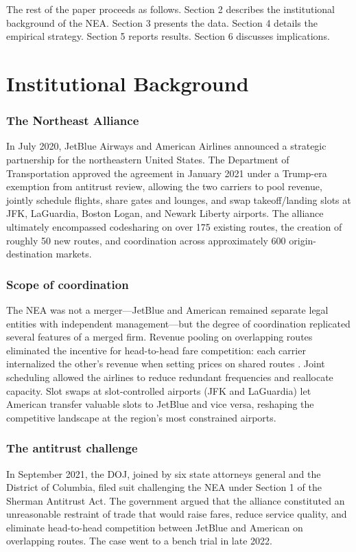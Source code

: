 \documentclass[12pt]{article}
\begin{document}
The rest of the paper proceeds as follows. Section 2 describes the institutional background of the NEA. Section 3 presents the data. Section 4 details the empirical strategy. Section 5 reports results. Section 6 discusses implications.


\section{Institutional Background}

\subsubsection*{The Northeast Alliance} In July 2020, JetBlue Airways and American Airlines announced a strategic partnership for the northeastern United States. The Department of Transportation approved the agreement in January 2021 under a Trump-era exemption from antitrust review, allowing the two carriers to pool revenue, jointly schedule flights, share gates and lounges, and swap takeoff/landing slots at JFK, LaGuardia, Boston Logan, and Newark Liberty airports. The alliance ultimately encompassed codesharing on over 175 existing routes, the creation of roughly 50 new routes, and coordination across approximately 600 origin-destination markets.

\subsubsection*{Scope of coordination} The NEA was not a merger---JetBlue and American remained separate legal entities with independent management---but the degree of coordination replicated several features of a merged firm. Revenue pooling on overlapping routes eliminated the incentive for head-to-head fare competition: each carrier internalized the other's revenue when setting prices on shared routes \citep{brueckner2001,bruecknerwhalen2000}. Joint scheduling allowed the airlines to reduce redundant frequencies and reallocate capacity. Slot swaps at slot-controlled airports (JFK and LaGuardia) let American transfer valuable slots to JetBlue and vice versa, reshaping the competitive landscape at the region's most constrained airports.

\subsubsection*{The antitrust challenge} In September 2021, the DOJ, joined by six state attorneys general and the District of Columbia, filed suit challenging the NEA under Section 1 of the Sherman Antitrust Act. The government argued that the alliance constituted an unreasonable restraint of trade that would raise fares, reduce service quality, and eliminate head-to-head competition between JetBlue and American on overlapping routes. The case went to a bench trial in late 2022.
\end{document}
